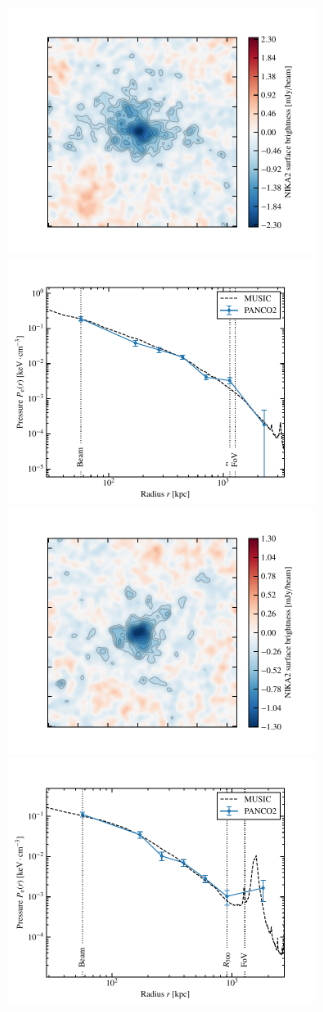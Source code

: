 \begin{figure}[p]
    \centering
    \includegraphics[height=6.5cm, trim={1.4cm 0.5cm 0.8cm 1.0cm}, clip]{Figures/Chap_panco/profiles_music/Bin1_cl00024_map.pdf} \hspace{10pt}
    \includegraphics[height=6.5cm, trim={0cm 0cm 1cm 1.0cm}, clip]{Figures/Chap_panco/profiles_music_2/00024.0.54.pdf}
    \includegraphics[height=6.5cm, trim={1.4cm 0.5cm 0.8cm 1.0cm}, clip]{Figures/Chap_panco/profiles_music/Bin1_cl00032_map.pdf} \hspace{10pt}
    \includegraphics[height=6.5cm, trim={0cm 0cm 1cm 1.0cm}, clip]{Figures/Chap_panco/profiles_music_2/00032.0.54.pdf}

\end{figure}
